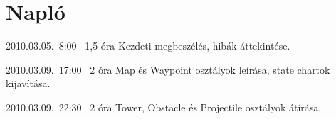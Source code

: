 %
\section{Napló}

\begin{naplo}

\bejegyzes
{2010.03.05.~8:00~} %
{1,5 óra} %
{\vadam\newline
\vantal\newline
\vbator\newline
\vtorok} %
{Kezdeti megbeszélés, hibák áttekintése.} %

\bejegyzes
{2010.03.09.~17:00~}
{2 óra}
{\vadam}
{Map és Waypoint osztályok leírása, state chartok kijavítása.}

\bejegyzes
{2010.03.09.~22:30~}
{2 óra}
{\vadam}
{Tower, Obstacle és Projectile osztályok átírása.}



\end{naplo}

